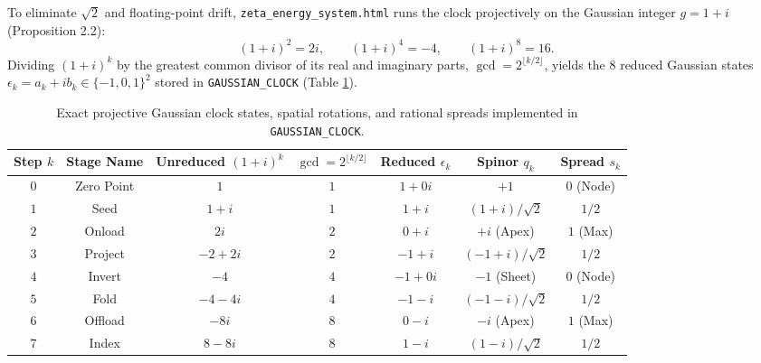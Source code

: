 \documentclass[11pt, a4paper]{article}
\begin{document}
To eliminate $\sqrt{2}$ and floating-point drift, \texttt{zeta\_energy\_system.html} runs the clock projectively on the Gaussian integer $g = 1+i$ (Proposition 2.2):
\begin{equation}
(1+i)^2 = 2i, \qquad (1+i)^4 = -4, \qquad (1+i)^8 = 16.
\end{equation}
Dividing $(1+i)^k$ by the greatest common divisor of its real and imaginary parts, $\gcd = 2^{\lfloor k/2\rfloor}$, yields the 8 reduced Gaussian states $\epsilon_k = a_k + i b_k \in \{-1, 0, 1\}^2$ stored in \texttt{GAUSSIAN\_CLOCK} (Table \ref{tab:clock-table}).

\begin{table}[htbp]
\centering
\caption{Exact projective Gaussian clock states, spatial rotations, and rational spreads implemented in \texttt{GAUSSIAN\_CLOCK}.}
\label{tab:clock-table}
\begin{tabular}{@{}ccccccc@{}}
\toprule
\textbf{Step $k$} & \textbf{Stage Name} & \textbf{Unreduced $(1+i)^k$} & \textbf{$\gcd = 2^{\lfloor k/2\rfloor}$} & \textbf{Reduced $\epsilon_k$} & \textbf{Spinor $q_k$} & \textbf{Spread $s_k$} \\
\midrule
$0$ & Zero Point & $1$ & $1$ & $1 + 0i$ & $+1$ & $0$ (Node) \\
$1$ & Seed & $1 + i$ & $1$ & $1 + i$ & $(1+i)/\sqrt{2}$ & $1/2$ \\
$2$ & Onload & $2i$ & $2$ & $0 + i$ & $+i$ (Apex) & $1$ (Max) \\
$3$ & Project & $-2 + 2i$ & $2$ & $-1 + i$ & $(-1+i)/\sqrt{2}$ & $1/2$ \\
$4$ & Invert & $-4$ & $4$ & $-1 + 0i$ & $-1$ (Sheet) & $0$ (Node) \\
$5$ & Fold & $-4 - 4i$ & $4$ & $-1 - i$ & $(-1-i)/\sqrt{2}$ & $1/2$ \\
$6$ & Offload & $-8i$ & $8$ & $0 - i$ & $-i$ (Apex) & $1$ (Max) \\
$7$ & Index & $8 - 8i$ & $8$ & $1 - i$ & $(1-i)/\sqrt{2}$ & $1/2$ \\
\bottomrule
\end{tabular}
\end{table}
\end{document}
